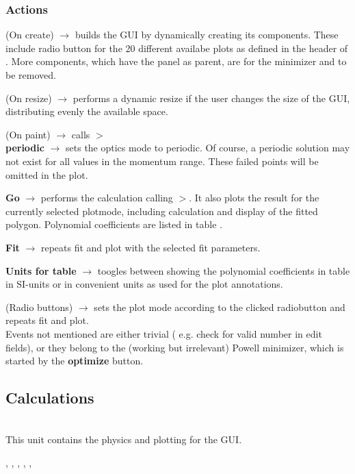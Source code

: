 \documentclass[12pt]{article}
\newcommand\code[1]{{\tt #1}}
\newcommand{\ofld}[1]{\colorbox{black!15}{{{\color{black}\bf #1}}}}
\newcommand{\ofldx}[1]{\colorbox{black!15}{{\color{black}(#1)}}}
\newcommand\guico[1]{{\color{blue}\code{#1}}}
\newcommand{\unico}[1]{{\color{burntorange}\code{#1}}}
\newcommand{\evcod}[2]{\ofld{#1} $\rightarrow$ \guico{#2}}
\newcommand{\evcodx}[2]{\ofldx{#1} $\rightarrow$ \guico{#2}}
\newcommand{\prcod}[2]{\opauni{#1}$>$\unico{#2}}
\newcommand{\opagui}[1]{\colorbox{blue!20}{{\color{black}\code{#1}}}}
\newcommand{\ogui}[1]{\hyperref[#1]{\opagui{#1}}}
\newcommand{\opaguif}[1]{\colorbox{violet!30}{{\color{black}\code{#1}}}}
\newcommand{\oguif}[1]{\hyperref[#1]{\opaguif{#1}}}
\newcommand{\opauni}[1]{\colorbox{orange!30}{{\color{black}\code{#1}}}}
\newcommand{\ounih}[2]{\subsection{\label{#2}#1}{\Huge\opauni{#2}}\\}
\newcommand{\ouni}[1]{\hyperref[#1]{\opauni{#1}}}
\newcommand{\uses}[1]{\flushleft {\bf Uses:} #1}
\newcommand{\desc}[1]{#1}
\newcommand{\act}[1]{\subsubsection*{Actions} #1}
\newcommand{\todo}[1]{{\color{red} #1}}
\begin{document}
\act{
\evcodx{On create}{FormCreate} builds the GUI by dynamically creating its components. These include radio button for the 20 different availabe plots as defined in the header of \ouni{momentumlib}. \todo{More components, which have the \guico{panmin} panel as parent, are for the minimizer and to be removed.}

\evcodx{On resize}{FormResize} performs a dynamic resize if the user changes the size of the GUI, distributing evenly the available space.

\evcodx{On paint}{FormPaint} calls \prcod{momentumlib}{MakePlot}\\

\evcod{periodic}{chkPerClick} sets the optics mode to periodic. Of course, a periodic solution may not exist for all values in the momentum range. These failed points will be omitted in the plot.

\evcod{Go}{butGoClick} performs the calculation calling \prcod{momentumlib}{FullCalc}. It also plots the result for the currently selected plotmode, including calculation and display of the fitted polygon. Polynomial coefficients are listed in table \guico{gfit}.

\evcod{Fit}{butFitClick} repeats fit and plot with the selected fit parameters.

\evcod{Units for table}{butfunitClick} toogles between showing the polynomial coefficients in table \guico{gfit} in SI-units or in convenient units as used for the plot annotations.

\evcodx{Radio buttons}{rbClick} sets the plot mode according to the clicked radiobutton and repeats fit and plot. \\

Events not mentioned are either trivial ( e.g. check for valid number in edit fields), or they belong to the (working but irrelevant) Powell minimizer, which is started by the \ofld{optimize} button. 
}


\ounih{Calculations}{momentumlib} 

\desc{This unit contains the physics and plotting for the \ogui{opamomentum} GUI.
}

\uses{\ouni{linoplib}, \ogui{opatunediag}, \ouni{globlib}, \ouni{mathlib}, \oguif{comfigureframe}, \ouni{comauxlib}} 
\end{document}
